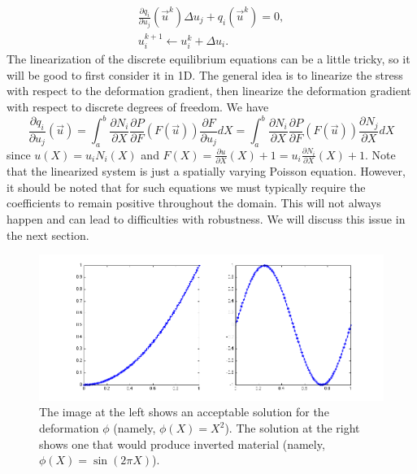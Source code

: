 \begin{gather*}
\frac{\partial q_i}{\partial u_j} \left( \vec{u}^k \right) \Delta{u}_j + q_i \left( \vec{u}^k \right) = 0, \\
u_i^{k+1} \leftarrow u_i^{k} + \Delta{u}_i.
\end{gather*}
The linearization of the discrete equilibrium equations can be a little tricky, so it will be good to first consider it in 1D. The general idea is to linearize the stress with respect to the deformation gradient, then linearize the deformation gradient with respect to discrete degrees of freedom. We have
\begin{equation*}
\frac{\partial q_i}{\partial u_j} \left( \vec{u} \right) = \int_a^b \frac{\partial N_i}{\partial X} \frac{\partial P}{\partial F} \left( F \left( \vec{u} \right) \right) \frac{\partial F}{\partial u_j} dX = \int_a^b \frac{\partial N_i}{\partial X} \frac{\partial P}{\partial F} \left( F \left( \vec{u} \right) \right) \frac{\partial N_j}{\partial X} dX
\end{equation*}
since $u(X) = u_i N_i(X)$ and $F(X) = \frac{\partial u}{\partial X}(X) + 1 = u_i \frac{\partial N_i}{\partial X}(X) + 1$. Note that the linearized system is just a spatially varying Poisson equation. However, it should be noted that for such equations we must typically require the coefficients to remain positive throughout the domain. This will not always happen and can lead to difficulties with robustness. We will discuss this issue in the next section.

\begin{figure}
\includegraphics[width=\columnwidth]{images/elasticity_1d}
\caption{The image at the left shows an acceptable solution for the deformation $\phi$ (namely, $\phi(X) = X^2$). The solution at the right shows one that would produce inverted material (namely, $\phi(X) = \sin \left( 2 \pi X \right)$).}
\label{fig:inversion}
\end{figure}

